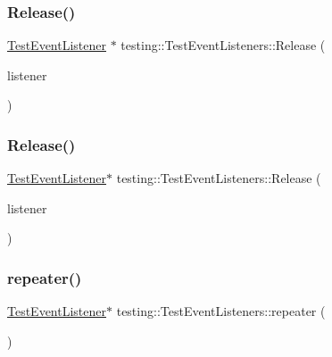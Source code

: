 \subsubsection{\texorpdfstring{Release()}{Release()}\hspace{0.1cm}{\footnotesize\ttfamily [2/3]}}
{\footnotesize\ttfamily \mbox{\hyperlink{classtesting_1_1_test_event_listener}{Test\+Event\+Listener}} $\ast$ testing\+::\+Test\+Event\+Listeners\+::\+Release (\begin{DoxyParamCaption}\item[{\mbox{\hyperlink{classtesting_1_1_test_event_listener}{Test\+Event\+Listener}} $\ast$}]{listener }\end{DoxyParamCaption})}

\mbox{\label{classtesting_1_1_test_event_listeners_a5d4bfb7d8584801d6074bb0ec28f8bda}} 
\subsubsection{\texorpdfstring{Release()}{Release()}\hspace{0.1cm}{\footnotesize\ttfamily [3/3]}}
{\footnotesize\ttfamily \mbox{\hyperlink{classtesting_1_1_test_event_listener}{Test\+Event\+Listener}}$\ast$ testing\+::\+Test\+Event\+Listeners\+::\+Release (\begin{DoxyParamCaption}\item[{\mbox{\hyperlink{classtesting_1_1_test_event_listener}{Test\+Event\+Listener}} $\ast$}]{listener }\end{DoxyParamCaption})}

\mbox{\label{classtesting_1_1_test_event_listeners_a3de1e101514bdba3e74b93adc604e9c4}} 
\subsubsection{\texorpdfstring{repeater()}{repeater()}\hspace{0.1cm}{\footnotesize\ttfamily [1/3]}}
{\footnotesize\ttfamily \mbox{\hyperlink{classtesting_1_1_test_event_listener}{Test\+Event\+Listener}}$\ast$ testing\+::\+Test\+Event\+Listeners\+::repeater (\begin{DoxyParamCaption}{ }\end{DoxyParamCaption})\hspace{0.3cm}{\ttfamily [private]}}

